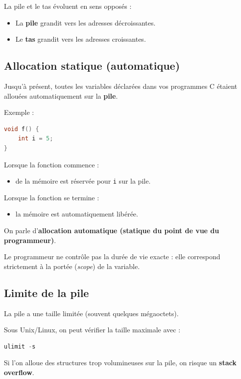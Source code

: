 La pile et le tas évoluent en sens opposés :

\begin{itemize}
    \item La \textbf{pile} grandit vers les adresses décroissantes.
    \item Le \textbf{tas} grandit vers les adresses croissantes.
\end{itemize}

\subsection{Allocation statique (automatique)}

Jusqu’à présent, toutes les variables déclarées dans vos programmes C
étaient allouées automatiquement sur la \textbf{pile}.

Exemple :

\begin{lstlisting}[language=C]
void f() {
    int i = 5;
}
\end{lstlisting}

Lorsque la fonction commence :
\begin{itemize}
    \item de la mémoire est réservée pour \texttt{i} sur la pile.
\end{itemize}

Lorsque la fonction se termine :
\begin{itemize}
    \item la mémoire est automatiquement libérée.
\end{itemize}

On parle d’\textbf{allocation automatique (statique du point de vue du programmeur)}.

Le programmeur ne contrôle pas la durée de vie exacte :
elle correspond strictement à la portée (\textit{scope}) de la variable.

\subsection{Limite de la pile}

La pile a une taille limitée (souvent quelques mégaoctets).

Sous Unix/Linux, on peut vérifier la taille maximale avec :

\begin{lstlisting}[language=C]
ulimit -s
\end{lstlisting}

Si l’on alloue des structures trop volumineuses sur la pile,
on risque un \textbf{stack overflow}.


